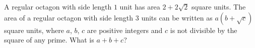 A regular octagon with side length $1$ unit has area $2+2\sqrt2$ square units. The area of a regular octagon with side length $3$ units can be written as $a(b+\sqrt c)$ square units, where $a$, $b$, $c$ are positive integers and $c$ is not divisible by the square of any prime. What is $a+b+c$?
